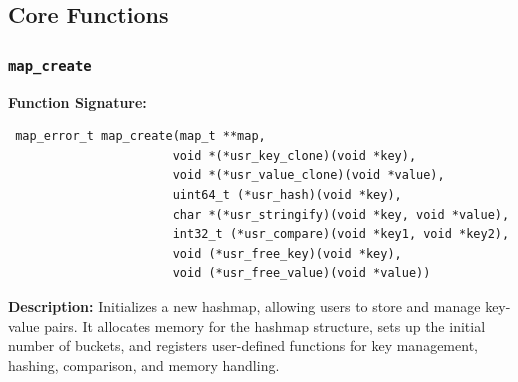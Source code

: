\documentclass[titlepage]{article}
\begin{document}
\subsection{Core Functions}

\subsubsection{\texttt{map\_create}} %
\textbf{Function Signature:}
\begin{verbatim}
 map_error_t map_create(map_t **map,
                       void *(*usr_key_clone)(void *key),
                       void *(*usr_value_clone)(void *value),
                       uint64_t (*usr_hash)(void *key),
                       char *(*usr_stringify)(void *key, void *value),
                       int32_t (*usr_compare)(void *key1, void *key2),
                       void (*usr_free_key)(void *key),
                       void (*usr_free_value)(void *value))
\end{verbatim}

\textbf{Description:} Initializes a new hashmap, allowing users to store and manage key-value pairs.
It allocates memory for the hashmap structure, sets up the initial number of buckets, and registers user-defined
functions for key management, hashing, comparison, and memory handling.\\
\end{document}
